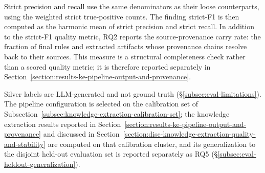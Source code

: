 Strict precision and recall use the same denominators as their loose counterparts, using the weighted strict true-positive counts. The finding strict-F1 is then computed as the harmonic mean of strict precision and strict recall. In addition to the strict-F1 quality metric, RQ2 reports the source-provenance carry rate: the fraction of final rules and extracted artifacts whose provenance chains resolve back to their sources. This measure is a structural completeness check rather than a scored quality metric; it is therefore reported separately in Section~\ref{section:results-ke-pipeline-output-and-provenance}.

Silver labels are LLM-generated and not ground truth (§\ref{subsec:eval-limitations}). The pipeline configuration is selected on the calibration set of Subsection~\ref{subsec:knowledge-extraction-calibration-set}; the knowledge extraction results reported in Section~\ref{section:results-ke-pipeline-output-and-provenance} and discussed in Section~\ref{section:disc-knowledge-extraction-quality-and-stability} are computed on that calibration cluster, and its generalization to the disjoint held-out evaluation set is reported separately as RQ5 (§\ref{subsec:eval-heldout-generalization}).